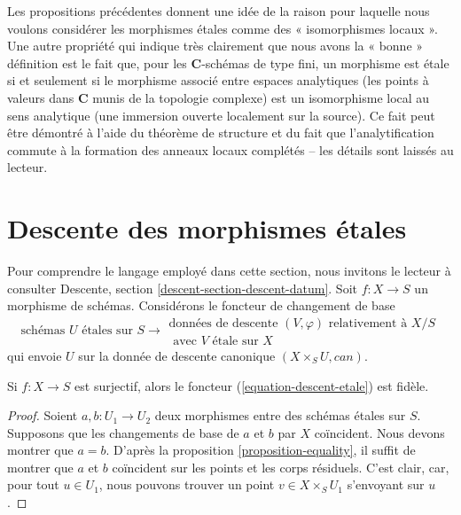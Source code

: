 \noindent
Les propositions précédentes donnent une idée de la raison pour laquelle nous voulons considérer
les morphismes \'etales comme des « isomorphismes locaux ». Une autre propriété qui indique
très clairement que nous avons la « bonne » définition est le fait que,
pour les $\mathbf{C}$-schémas de type fini, un morphisme est \'etale si et seulement si
le morphisme associé entre espaces analytiques (les points à valeurs dans $\mathbf{C}$ munis
de la topologie complexe) est un isomorphisme local au sens analytique (une immersion
ouverte localement sur la source). Ce fait peut être démontré à l'aide du
théorème de structure et du fait que l'analytification commute à la
formation des anneaux locaux complétés -- les détails sont laissés au lecteur.








\section{Descente des morphismes \'etales}
\label{section-descending-etale}

\noindent
Pour comprendre le langage employé dans cette section, nous invitons
le lecteur à consulter
Descente, section \ref{descent-section-descent-datum}.
Soit $f : X \to S$ un morphisme de schémas. Considérons le
foncteur de changement de base
\begin{equation}
\label{equation-descent-etale}
\text{schémas }U\text{ \'etales sur }S \longrightarrow
\begin{matrix}
\text{données de descente }(V, \varphi)\text{ relativement à }X/S \\
\text{ avec }V\text{ \'etale sur }X
\end{matrix}
\end{equation}
qui envoie $U$ sur la donnée de descente canonique $(X \times_S U, can)$.

\begin{lemma}
\label{lemma-faithful}
Si $f : X \to S$ est surjectif, alors le foncteur
(\ref{equation-descent-etale}) est fidèle.
\end{lemma}

\begin{proof}
Soient $a, b : U_1 \to U_2$ deux morphismes entre des schémas \'etales sur $S$.
Supposons que les changements de base de $a$ et $b$ par $X$ coïncident.
Nous devons montrer que $a = b$.
D'après la proposition \ref{proposition-equality}, il suffit de
montrer que $a$ et $b$ coïncident sur les points et les corps résiduels.
C'est clair, car, pour tout $u \in U_1$, nous pouvons trouver un point
$v \in X \times_S U_1$ s'envoyant sur $u$.
\end{proof}

